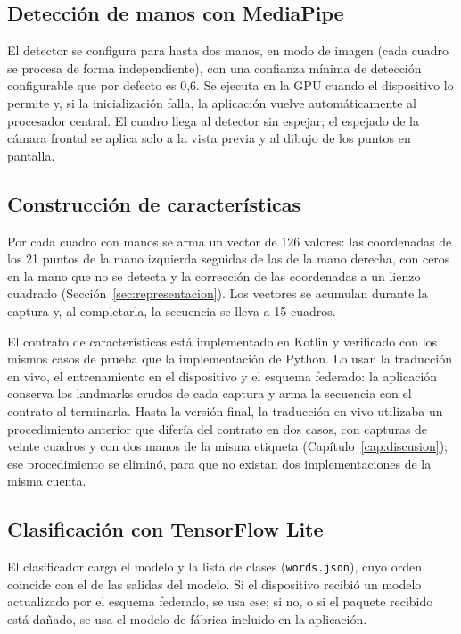 \subsection{Detección de manos con MediaPipe}

El detector se configura para hasta dos manos, en modo de imagen (cada cuadro se procesa de forma independiente), con una confianza mínima de detección configurable que por defecto es 0,6. Se ejecuta en la GPU cuando el dispositivo lo permite y, si la inicialización falla, la aplicación vuelve automáticamente al procesador central. El cuadro llega al detector sin espejar; el espejado de la cámara frontal se aplica solo a la vista previa y al dibujo de los puntos en pantalla.

\subsection{Construcción de características}

Por cada cuadro con manos se arma un vector de 126 valores: las coordenadas de los 21 puntos de la mano izquierda seguidas de las de la mano derecha, con ceros en la mano que no se detecta y la corrección de las coordenadas a un lienzo cuadrado (Sección~\ref{sec:representacion}). Los vectores se acumulan durante la captura y, al completarla, la secuencia se lleva a 15 cuadros.

El contrato de características está implementado en Kotlin y verificado con los mismos casos de prueba que la implementación de Python. Lo usan la traducción en vivo, el entrenamiento en el dispositivo y el esquema federado: la aplicación conserva los landmarks crudos de cada captura y arma la secuencia con el contrato al terminarla. Hasta la versión final, la traducción en vivo utilizaba un procedimiento anterior que difería del contrato en dos casos, con capturas de veinte cuadros y con dos manos de la misma etiqueta (Capítulo~\ref{cap:discusion}); ese procedimiento se eliminó, para que no existan dos implementaciones de la misma cuenta.

\subsection{Clasificación con TensorFlow Lite}

El clasificador carga el modelo y la lista de clases (\texttt{words.json}), cuyo orden coincide con el de las salidas del modelo. Si el dispositivo recibió un modelo actualizado por el esquema federado, se usa ese; si no, o si el paquete recibido está dañado, se usa el modelo de fábrica incluido en la aplicación.

